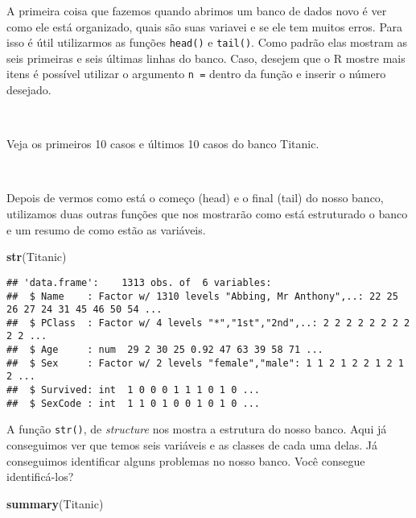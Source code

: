 \documentclass[]{book}
\newenvironment{Shaded}{\begin{snugshade}}{\end{snugshade}}
\newcommand{\KeywordTok}[1]{\textcolor[rgb]{0.13,0.29,0.53}{\textbf{#1}}}
\newcommand{\NormalTok}[1]{#1}
\theoremstyle{definition}
\theoremstyle{definition}
\theoremstyle{definition}
\theoremstyle{remark}
\let\BeginKnitrBlock\begin \let\EndKnitrBlock\end
\begin{document}
A primeira coisa que fazemos quando abrimos um banco de dados novo é ver como ele está organizado, quais são suas variavei e se ele tem muitos erros. Para isso é útil utilizarmos as funções \texttt{head()} e \texttt{tail()}. Como padrão elas mostram as seis primeiras e seis últimas linhas do banco. Caso, desejem que o R mostre mais itens é possível utilizar o argumento \texttt{n\ =} dentro da função e inserir o número desejado.

~
\BeginKnitrBlock{exercise}
\protect\hypertarget{exr:unnamed-chunk-84}{}{\label{exr:unnamed-chunk-84} }Veja os primeiros 10 casos e últimos 10 casos do banco Titanic.
\EndKnitrBlock{exercise}

~

Depois de vermos como está o começo (head) e o final (tail) do nosso banco, utilizamos duas outras funções que nos mostrarão como está estruturado o banco e um resumo de como estão as variáveis.

\begin{Shaded}
\begin{Highlighting}[]
\KeywordTok{str}\NormalTok{(Titanic) }
\end{Highlighting}
\end{Shaded}

\begin{verbatim}
## 'data.frame':    1313 obs. of  6 variables:
##  $ Name    : Factor w/ 1310 levels "Abbing, Mr Anthony",..: 22 25 26 27 24 31 45 46 50 54 ...
##  $ PClass  : Factor w/ 4 levels "*","1st","2nd",..: 2 2 2 2 2 2 2 2 2 2 ...
##  $ Age     : num  29 2 30 25 0.92 47 63 39 58 71 ...
##  $ Sex     : Factor w/ 2 levels "female","male": 1 1 2 1 2 2 1 2 1 2 ...
##  $ Survived: int  1 0 0 0 1 1 1 0 1 0 ...
##  $ SexCode : int  1 1 0 1 0 0 1 0 1 0 ...
\end{verbatim}

A função \texttt{str()}, de \emph{structure} nos mostra a estrutura do nosso banco. Aqui já conseguimos ver que temos seis variáveis e as classes de cada uma delas. Já conseguimos identificar alguns problemas no nosso banco. Você consegue identificá-los?

\begin{Shaded}
\begin{Highlighting}[]
\KeywordTok{summary}\NormalTok{(Titanic)}
\end{Highlighting}
\end{Shaded}
\end{document}
